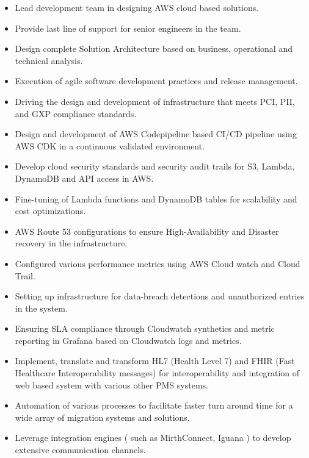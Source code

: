 \documentclass[10pt,a4paper,ragged2e]{altacv}
\begin{document}
\begin{itemize}
    \item Lead development team in designing AWS cloud based solutions. 
    \item Provide last line of support for senior engineers in the team.
    \item Design complete Solution Architecture based on business, operational and technical analysis.
    \item Execution of agile software development practices and release management.
    \item Driving the design and development of infrastructure that meets PCI, PII, and GXP compliance standards.
    \item Design and development of AWS Codepipeline based CI/CD pipeline using AWS CDK in a continuous validated environment.
    \item Develop cloud security standards and security audit trails for S3, Lambda, DynamoDB and API access in AWS.
    \item Fine-tuning of Lambda functions and DynamoDB tables for scalability and cost optimizations.
    \item AWS Route 53 configurations to ensure High-Availability and Disaster recovery in the infrastructure.
    \item Configured various performance metrics using AWS Cloud watch and Cloud Trail.
    \item Setting up infrastructure for data-breach detections and unauthorized entries in the system.
    \item Ensuring SLA compliance through Cloudwatch synthetics and metric reporting in Grafana based on Cloudwatch logs and metrics.
\end{itemize}

\vspace{10px}

\begin{itemize}
    \item Implement, translate and transform HL7 (Health Level 7) and FHIR (Fast Healthcare Interoperability messages) for interoperability and integration of web based system with various other PMS systems. 
    \item Automation of various processes to facilitate faster turn around time for a wide array of migration systems and solutions.
    \item Leverage integration engines ( such as MirthConnect, Iguana ) to develop extensive communication channels.
\end{itemize}
\end{document}
